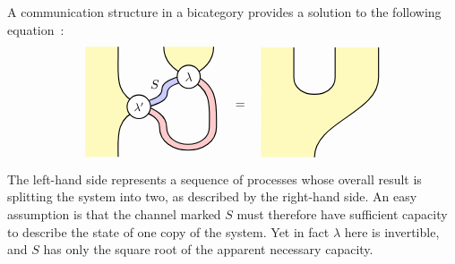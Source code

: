 \documentclass[a4paper,12pt]{article}
\theoremstyle{definition}
\renewcommand{\-}[0]{\nobreakdash-\hspace{0pt}}
\def\fillA{blue!40}
\def\fillB{red!40}
\def\fillD{yellow!50}
\def\sideangle{30}
\def\nwangle{180-\sideangle}
\def\neangle{\sideangle}
\def\swangle{180+\sideangle}
\def\seangle{-\sideangle}
\begin{document}
\noindent
A communication structure in a bicategory provides a solution to the following equation~\cite{v12-hqt, v12-hsqp}:
\begin{equation*}
\begin{aligned}
\begin{tikzpicture} [thick, yscale=0.7, fill opacity=0.5]
\draw [fill=\fillB, fill opacity=0.5, draw=none]  (0.78,-1)
to [out=up, in=\seangle](0.1,-0.1)
to (0, -0.3)
to [out=\seangle, in=up](0.58, -1)
to  [out=down, in=down, looseness=2](2.18,-1)
to [out=up, in=\seangle](1.5,1.1)
to (1.4, 0.9)
to [out=\seangle, in=up] (1.98, -1)
to [out=down, in=down, looseness=2](0.78, -1);
\draw   (0.78,-1)
to [out=up, in=\seangle](0.1,-0.1)
to (0, -0.3)
to [out=\seangle, in=up](0.58, -1)
to  [out=down, in=down, looseness=2](2.18,-1)
to [out=up, in=\seangle](1.5,1.1)
to (1.4, 0.9)
to [out=\seangle, in=up] (1.98, -1)
to [out=down, in=down, looseness=2](0.78, -1);
\draw [fill=\fillD, draw=none] (-1.5,-2.2)
to (-1.5,2.2)
to (-0.58,2.2)
to (-0.58,1.8)
to [out=down, in=\nwangle](0,-0.1)
to (0, -0.3)
to [out=\swangle, in=up](-0.58, -2.2);
\draw (-0.58,2.2)
to (-0.58,1.8)
to [out=down, in=\nwangle](0,-0.1)
to (0, -0.3)
to [out=\swangle, in=up](-0.58, -2.2);
\draw [fill=\fillD, draw=none] (0.7, 2.2) 
to [out=down, in=\nwangle](1.4,1)
to [out=\neangle, in=down](2.1,2.2);
\draw (0.7, 2.2) 
to [out=down, in=\nwangle](1.4,1)
to [out=\neangle, in=down](2.1,2.2);
\draw [fill=\fillA, draw=none](0,-0.1)
to [out=\neangle, in=down] (0.65, 0.5)
to [out=up, in=\swangle](1.3, 1.1)
to (1.4, 0.9)
to [out=\swangle, in=up](0.8, 0.35)
to [out=down, in=\neangle](0.1, -0.3);
\draw (0,-0.1)
to [out=\neangle, in=down] (0.65, 0.5)
to [out=up, in=\swangle](1.3, 1.1)
to (1.4, 0.9)
to [out=\swangle, in=up](0.8, 0.35)
to [out=down, in=\neangle](0.1, -0.3);
\node [draw, fill=white, fill opacity=1, shape=circle, fill opacity=1, scale=0.9]
 at (0, -0.2) {$\lambda'$};
\node [draw, fill=white, fill opacity=1, shape=circle, fill opacity=1]
 at (1.4, 1) {$\lambda$};
\node [fill opacity=1]
 at (0.45, 0.7) {$S$};
\end{tikzpicture}
\end{aligned}
\quad=\quad
\begin{aligned}
\begin{tikzpicture} [thick, yscale=0.7, fill opacity=0.5]
\draw [fill=\fillD, draw=none] (-1.5,-2.2)
to (-1.5,2.2)
to (-0.58,2.2)
to (-0.58,1.0)
to [out=down, in=down, looseness=2](0.58,1.0)
to (0.58,2.2)
to (1.8, 2.2)
to (1.8,1)
to [out=down, in=up] (0,-2.2);
\draw (-0.58,2.2)
to (-0.58,1.0)
to [out=down, in=down, looseness=2](0.58,1.0)
to (0.58,2.2);
\draw (1.8, 2.2)
to (1.8,1)
to [out=down, in=up] (0,-2.2);
\end{tikzpicture}
\end{aligned}
\end{equation*}
The left-hand side represents a sequence of processes whose overall result is splitting the system into two, as described by the right-hand side. An easy assumption is that the channel marked $S$ must therefore have sufficient capacity to describe the state of one copy of the system. Yet in fact $\lambda$ here is invertible, and $S$ has only the square root of the apparent necessary capacity.
\end{document}
